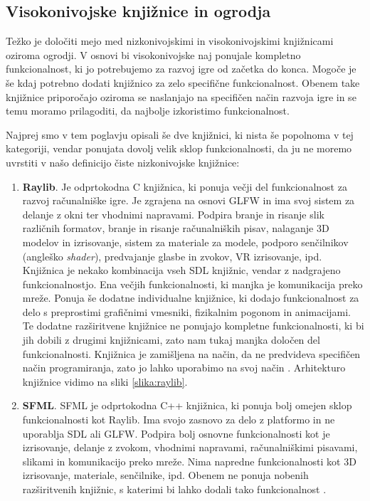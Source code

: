 \documentclass[12pt,a4paper,twoside]{book}
\begin{document}
\subsection{Visokonivojske knjižnice in ogrodja}
Težko je določiti mejo med nizkonivojskimi in visokonivojskimi knjižnicami oziroma ogrodji. V osnovi bi visokonivojske naj ponujale kompletno funkcionalnost, ki jo potrebujemo za razvoj igre od začetka do konca. Mogoče je še kdaj potrebno dodati knjižnico za zelo specifične funkcionalnost. Obenem take knjižnice priporočajo oziroma se naslanjajo na specifičen način razvoja igre in se temu moramo prilagoditi, da najbolje izkoristimo funkcionalnost. 

Najprej smo v tem poglavju opisali še dve knjižnici, ki nista še popolnoma v tej kategoriji, vendar ponujata dovolj velik sklop funkcionalnosti, da ju ne moremo uvrstiti v našo definicijo čiste nizkonivojske knjižnice:
\begin{enumerate}
	\item \textbf{Raylib}. Je odprtokodna C knjižnica, ki ponuja večji del funkcionalnost za razvoj računalniške igre. Je zgrajena na osnovi GLFW in ima svoj sistem za delanje z okni ter vhodnimi napravami. Podpira branje in risanje slik različnih formatov, branje in risanje računalniških pisav, nalaganje 3D modelov in izrisovanje, sistem za materiale za modele, podporo senčilnikov (angleško \textit{shader}), predvajanje glasbe in zvokov, VR izrisovanje, ipd. Knjižnica je nekako kombinacija vseh SDL knjižnic, vendar z nadgrajeno funkcionalnostjo. Ena večjih funkcionalnosti, ki manjka je komunikacija preko mreže. Ponuja še dodatne individualne knjižnice, ki dodajo funkcionalnost za delo s preprostimi grafičnimi vmesniki, fizikalnim pogonom in animacijami. Te dodatne razširitvene knjižnice ne ponujajo kompletne funkcionalnosti, ki bi jih dobili z drugimi knjižnicami, zato nam tukaj manjka določen del funkcionalnosti. Knjižnica je zamišljena na način, da ne predvideva specifičen način programiranja, zato jo lahko uporabimo na svoj način \cite{raylib}. Arhitekturo knjižnice vidimo na sliki \ref{slika:raylib}.
	\item \textbf{SFML}. SFML je odprtokodna C++ knjižnica, ki ponuja bolj omejen sklop funkcionalnosti kot Raylib. Ima svojo zasnovo za delo z platformo in ne uporablja SDL ali GLFW. Podpira bolj osnovne funkcionalnosti kot je izrisovanje, delanje z zvokom, vhodnimi napravami, računalniškimi pisavami, slikami in komunikacijo preko mreže. Nima napredne funkcionalnosti kot 3D izrisovanje, materiale, senčilnike, ipd. Obenem ne ponuja nobenih razširitvenih knjižnic, s katerimi bi lahko dodali tako funkcionalnost \cite{sfml}. 
\end{enumerate}
\end{document}
